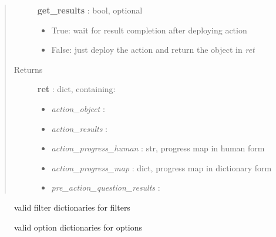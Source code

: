 \documentclass[letterpaper,10pt,english]{sphinxmanual}
\begin{document}
\begin{fulllineitems}
\begin{quote}
\begin{description}
\begin{itemize}
\end{itemize}

\textbf{get\_results} : bool, optional
\begin{itemize}
\item {} 
True: wait for result completion after deploying action

\item {} 
False: just deploy the action and return the object in \emph{ret}

\end{itemize}

\item[{Returns}] \leavevmode
\textbf{ret} : dict, containing:
\begin{itemize}
\item {} 
\emph{action\_object} : {\hyperref[taniumpy.object_types:taniumpy.object_types.action.Action]{}}

\item {} 
\emph{action\_results} : {\hyperref[taniumpy.object_types:taniumpy.object_types.result_set.ResultSet]{}}

\item {} 
\emph{action\_progress\_human} : str, progress map in human form

\item {} 
\emph{action\_progress\_map} : dict, progress map in dictionary form

\item {} 
\emph{pre\_action\_question\_results} : {\hyperref[taniumpy.object_types:taniumpy.object_types.result_set.ResultSet]{}}

\end{itemize}

\end{description}\end{quote}



\begin{description}
\item[{{\hyperref[pytan.constants:pytan.constants.FILTER_MAPS]{}}}] \leavevmode
valid filter dictionaries for filters

\item[{{\hyperref[pytan.constants:pytan.constants.OPTION_MAPS]{}}}] \leavevmode
valid option dictionaries for options


\end{description}
\end{fulllineitems}
\end{document}
